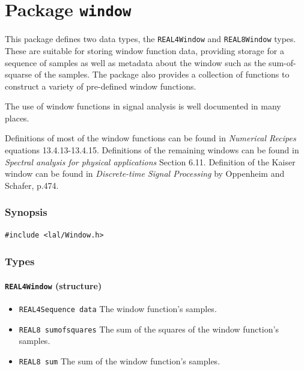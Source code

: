\chapter{Package \texttt{window}}
\label{s:Window.h}
\label{ss:Window.c}

This package defines two data types, the \texttt{REAL4Window} and
\texttt{REAL8Window} types.  These are suitable for storing window function
data, providing storage for a sequence of samples as well as metadata about
the window such as the sum-of-squarse of the samples.  The package also
provides a collection of functions to construct a variety of pre-defined
window functions.

The use of window functions in signal analysis is well documented in many
places.

Definitions of most of the window functions can be found in {\it Numerical
Recipes} \cite{numrec} equations 13.4.13-13.4.15.  Definitions of the
remaining windows can be found in {\it Spectral analysis for physical
applications} \cite{pw} Section 6.11.  Definition of the Kaiser window can
be found in \textit{Discrete-time Signal Processing} by Oppenheim and
Schafer, p.474.

\subsection*{Synopsis}

\begin{verbatim}
#include <lal/Window.h>
\end{verbatim}


\subsection*{Types}

\subsubsection{\texttt{REAL4Window} (structure)}
\begin{itemize}
\item \texttt{REAL4Sequence data}  The window function's samples.
\item \texttt{REAL8 sumofsquares}  The sum of the squares of the window
function's samples.
\item \texttt{REAL8 sum}  The sum of the window function's samples.
\end{itemize}

